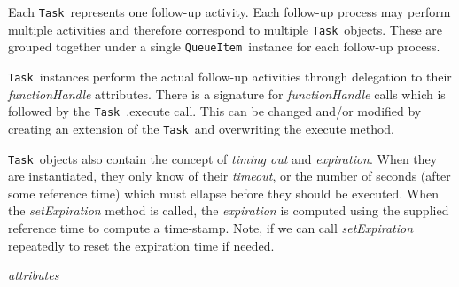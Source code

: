 \documentclass{article}
\newcommand{\QueueItem}{\texttt{QueueItem}~}
\newcommand{\Task}{\texttt{Task}~}
\begin{document}
Each \Task represents one follow-up activity.
Each follow-up process may perform multiple activities and therefore correspond to multiple \Task objects.
These are grouped together under a single \QueueItem instance for each follow-up process.

\Task instances perform the actual follow-up activities through delegation to their \textit{functionHandle} attributes.
There is a signature for \textit{functionHandle} calls which is followed by the \Task.execute call.
This can be changed and/or modified by creating an extension of the \Task and overwriting the execute method.

\Task objects also contain the concept of \textit{timing out} and \textit{expiration}.
When they are instantiated, they only know of their \textit{timeout}, or the number of seconds (after some reference time) which must ellapse before they should be executed.
When the \textit{setExpiration} method is called, the \textit{expiration} is computed using the supplied reference time to compute a time-stamp.
Note, if we can call \textit{setExpiration} repeatedly to reset the expiration time if needed.

\vspace{0.5cm}
\noindent
\textit{attributes}
\end{document}
